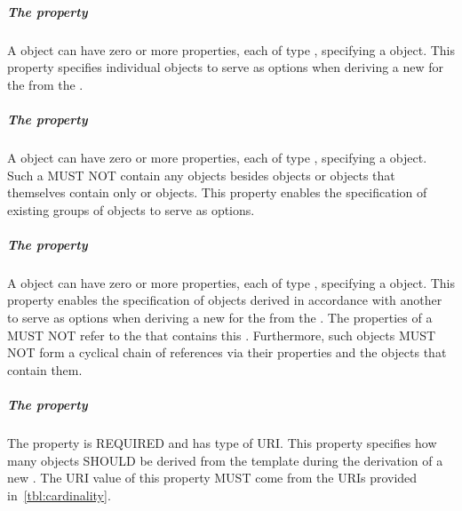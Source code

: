\subparagraph{The  property}\label{sec:variant}

A   object can have zero or more  properties, each of type , specifying a  object. This property specifies individual  objects to serve as options when deriving a new   for the    from the .

\subparagraph{The  property}\label{sec:variantCollection}

A   object can have zero or more  properties, each of type , specifying a  object.
Such a  MUST NOT contain any objects besides  objects or  objects that themselves contain only  or  objects.
This property enables the specification of existing groups of  objects to serve as options.

\subparagraph{The  property}\label{sec:variantDerivation}

A   object can have zero or more  properties, each of type , specifying a  object. 
This property enables the specification of  objects derived in accordance with another  to serve as options when deriving a new   for the    from the . 
The  properties of a   MUST NOT refer to the  that contains this  . 
Furthermore, such   objects MUST NOT form a cyclical chain of references via their  properties and the  objects that contain them. 

\subparagraph{The  property}\label{sec:cardinality}

The  property is REQUIRED and has type of URI. This property specifies how many   objects SHOULD be derived from the template   during the derivation of a new . The URI value of this property MUST come from the URIs provided in~\ref{tbl:cardinality}.

